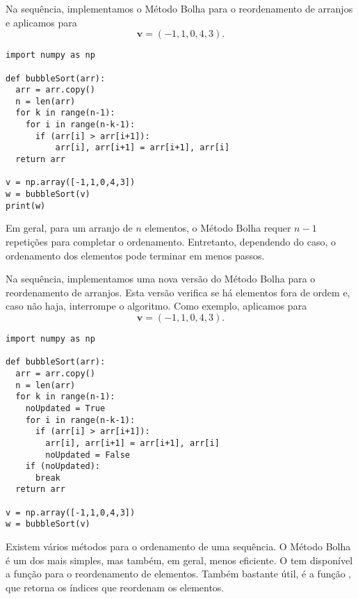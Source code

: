 \begin{ex}
  Na sequência, implementamos o Método Bolha para o reordenamento de arranjos e aplicamos para
  \begin{equation}
    \pmb{v} = (-1, 1, 0, 4, 3).
  \end{equation}
  
\begin{lstlisting}[caption=bubbleSort\_v1.py]
import numpy as np

def bubbleSort(arr):
  arr = arr.copy()
  n = len(arr)
  for k in range(n-1):
    for i in range(n-k-1):
      if (arr[i] > arr[i+1]):
          arr[i], arr[i+1] = arr[i+1], arr[i]
  return arr

v = np.array([-1,1,0,4,3])
w = bubbleSort(v)
print(w)
\end{lstlisting}

\end{ex}

\begin{obs}
  Em geral, para um arranjo de $n$ elementos, o Método Bolha requer $n-1$ repetições para completar o ordenamento. Entretanto, dependendo do caso, o ordenamento dos elementos pode terminar em menos passos.
\end{obs}

\begin{ex}
  Na sequência, implementamos uma nova versão do Método Bolha para o reordenamento de arranjos. Esta versão verifica se há elementos fora de ordem e, caso não haja, interrompe o algoritmo. Como exemplo, aplicamos para
  \begin{equation}
    \pmb{v} = (-1, 1, 0, 4, 3).
  \end{equation}
  
\begin{lstlisting}[caption=bubbleSort\_v2.py]
import numpy as np

def bubbleSort(arr):
  arr = arr.copy()
  n = len(arr)
  for k in range(n-1):
    noUpdated = True
    for i in range(n-k-1):
      if (arr[i] > arr[i+1]):
        arr[i], arr[i+1] = arr[i+1], arr[i]
        noUpdated = False
    if (noUpdated):
      break
  return arr

v = np.array([-1,1,0,4,3])
w = bubbleSort(v)
\end{lstlisting}

\end{ex}

\begin{obs}
  Existem vários métodos para o ordenamento de uma sequência. O Método Bolha é um dos mais simples, mas também, em geral, menos eficiente. O {\numpy} tem disponível a função {\PYTHONnumpyDOTsort} para o reordenamento de elementos. Também bastante útil, é a função {\PYTHONnumpyDOTargsort}, que retorna os índices que reordenam os elementos.
\end{obs}

